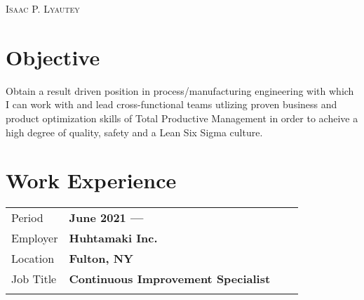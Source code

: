 \documentclass[a4paper, oneside, final, 10pt]{scrartcl} %
\newcommand{\gray}{\rowcolor[gray]{.90}} %
\begin{document}

\begin{center} %


{\fontsize{36}{36}\selectfont\scshape Isaac P. Lyautey}


\section{Objective}
\begin{center}
    Obtain a result driven position in process/manufacturing engineering with which I can work with and lead cross-functional teams utlizing proven business and product optimization skills of Total Productive Management in order to acheive a high degree of quality, safety and a Lean Six Sigma culture.
\end{center}



\section{Work Experience}

\begin{tabularx}{0.97\linewidth}{XX|XX}
    \gray{}Period    & \textbf{June 2021 --- } & \\
    \gray{}Employer  & \textbf{Huhtamaki Inc.}                 & \\
    \gray{}Location  & \textbf{Fulton, NY}   & \\
    \gray{}Job Title & \textbf{Continuous Improvement Specialist}          & \\
    \vspace{-10pt}
\end{tabularx}


\end{center}
\end{document}
